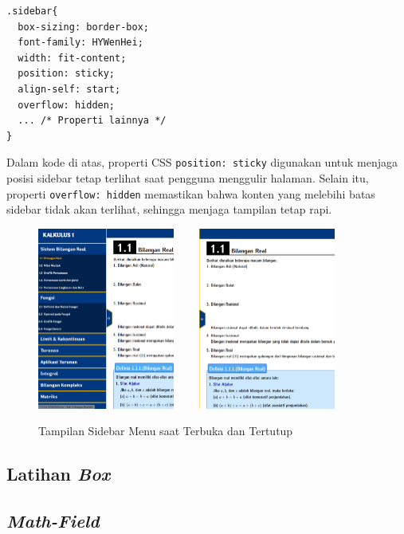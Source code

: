 \documentclass{file/KP-ITS}
\theoremstyle{definition}
\theoremstyle{definition}
\theoremstyle{plain}
\begin{document}
\begin{verbatim}
.sidebar{
  box-sizing: border-box;
  font-family: HYWenHei;
  width: fit-content;
  position: sticky;
  align-self: start;
  overflow: hidden;
  ... /* Properti lainnya */
}
\end{verbatim}
Dalam kode di atas, properti CSS \texttt{position: sticky} digunakan untuk menjaga posisi sidebar tetap terlihat saat pengguna menggulir halaman. Selain itu, properti \texttt{overflow: hidden} memastikan bahwa konten yang melebihi batas sidebar tidak akan terlihat, sehingga menjaga tampilan tetap rapi.
\begin{figure}[h!]
    \centering
    \includegraphics[width=0.4\textwidth]{foto/SidebarBuka.png}$\qquad$
    \includegraphics[width=0.4\textwidth]{foto/SidebarTutup.png}
    \caption{Tampilan Sidebar Menu saat Terbuka dan Tertutup}
\end{figure}

\subsection{Latihan \textit{Box}}

\subsection{\textit{Math-Field}}
\end{document}
